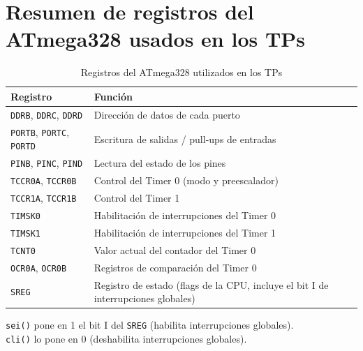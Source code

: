 \section{Resumen de registros del ATmega328 usados en los TPs}

\begin{table}[H]
\centering
\begin{tabular}{lp{9cm}}
\toprule
\textbf{Registro} & \textbf{Función} \\
\midrule
\texttt{DDRB}, \texttt{DDRC}, \texttt{DDRD} & Dirección de datos de cada puerto \\
\texttt{PORTB}, \texttt{PORTC}, \texttt{PORTD} & Escritura de salidas / pull-ups de entradas \\
\texttt{PINB}, \texttt{PINC}, \texttt{PIND} & Lectura del estado de los pines \\
\texttt{TCCR0A}, \texttt{TCCR0B} & Control del Timer 0 (modo y preescalador) \\
\texttt{TCCR1A}, \texttt{TCCR1B} & Control del Timer 1 \\
\texttt{TIMSK0} & Habilitación de interrupciones del Timer 0 \\
\texttt{TIMSK1} & Habilitación de interrupciones del Timer 1 \\
\texttt{TCNT0} & Valor actual del contador del Timer 0 \\
\texttt{OCR0A}, \texttt{OCR0B} & Registros de comparación del Timer 0 \\
\texttt{SREG} & Registro de estado (flags de la CPU, incluye el bit I de interrupciones globales) \\
\bottomrule
\end{tabular}
\caption{Registros del ATmega328 utilizados en los TPs}
\end{table}

\begin{notabox}
\texttt{sei()} pone en 1 el bit I del \texttt{SREG} (habilita interrupciones globales).\\
\texttt{cli()} lo pone en 0 (deshabilita interrupciones globales).
\end{notabox}
